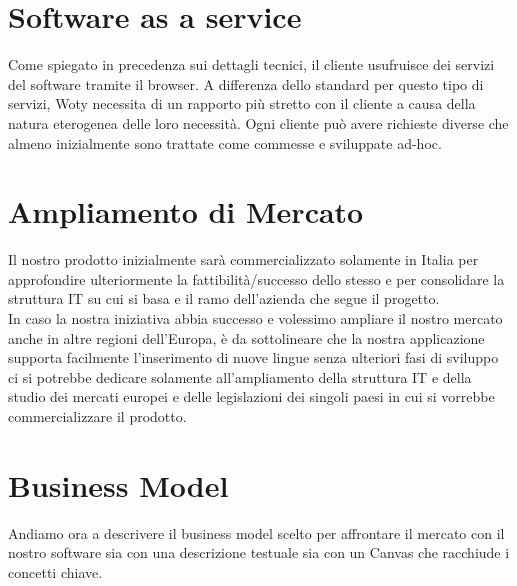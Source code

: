 \section{Software as a service}
Come spiegato in precedenza sui dettagli tecnici, il cliente usufruisce dei servizi del software tramite il browser. A differenza dello standard per questo tipo di servizi, Woty necessita di un rapporto più stretto con il cliente a causa della natura eterogenea delle loro necessità. Ogni cliente può avere richieste diverse che almeno inizialmente sono trattate come commesse e sviluppate ad-hoc.

\section{Ampliamento di Mercato}
Il nostro prodotto inizialmente sarà commercializzato solamente in Italia per approfondire ulteriormente la fattibilità/successo dello stesso e per consolidare la struttura IT su cui si basa e il ramo dell'azienda che segue il progetto.\\
In caso la nostra iniziativa abbia successo e volessimo ampliare il nostro mercato anche in altre regioni
dell'Europa, è da sottolineare che la nostra applicazione supporta facilmente l'inserimento di nuove lingue senza ulteriori fasi di sviluppo ci si potrebbe dedicare solamente all'ampliamento della struttura IT e della studio dei mercati europei e delle legislazioni dei singoli paesi in cui si vorrebbe commercializzare il prodotto.




\section{Business Model}
Andiamo ora a descrivere il business model scelto per affrontare il mercato con il nostro software sia con una descrizione testuale sia con un Canvas che racchiude i concetti chiave.

